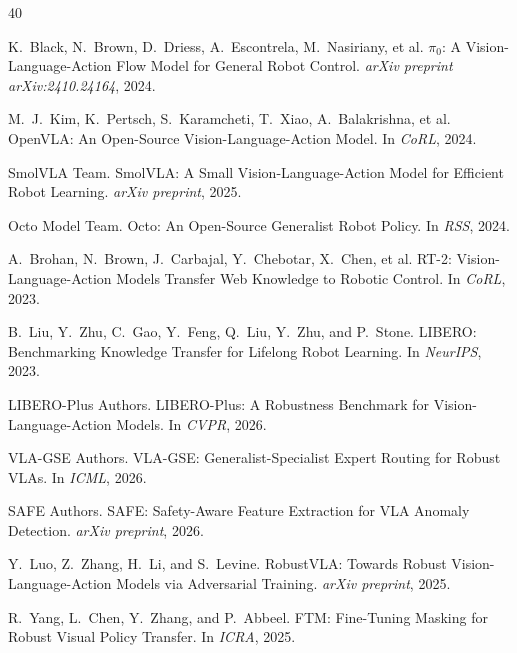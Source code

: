 \documentclass[10pt,twocolumn]{article}
\begin{document}
{\small

\begin{thebibliography}{40}

K.~Black, N.~Brown, D.~Driess, A.~Escontrela, M.~Nasiriany, et al.
\newblock $\pi_0$: A Vision-Language-Action Flow Model for General Robot Control.
\newblock \emph{arXiv preprint arXiv:2410.24164}, 2024.

M.~J.~Kim, K.~Pertsch, S.~Karamcheti, T.~Xiao, A.~Balakrishna, et al.
\newblock OpenVLA: An Open-Source Vision-Language-Action Model.
\newblock In \emph{CoRL}, 2024.

SmolVLA Team.
\newblock SmolVLA: A Small Vision-Language-Action Model for Efficient Robot Learning.
\newblock \emph{arXiv preprint}, 2025.

Octo Model Team.
\newblock Octo: An Open-Source Generalist Robot Policy.
\newblock In \emph{RSS}, 2024.

A.~Brohan, N.~Brown, J.~Carbajal, Y.~Chebotar, X.~Chen, et al.
\newblock RT-2: Vision-Language-Action Models Transfer Web Knowledge to Robotic Control.
\newblock In \emph{CoRL}, 2023.

B.~Liu, Y.~Zhu, C.~Gao, Y.~Feng, Q.~Liu, Y.~Zhu, and P.~Stone.
\newblock LIBERO: Benchmarking Knowledge Transfer for Lifelong Robot Learning.
\newblock In \emph{NeurIPS}, 2023.

LIBERO-Plus Authors.
\newblock LIBERO-Plus: A Robustness Benchmark for Vision-Language-Action Models.
\newblock In \emph{CVPR}, 2026.

VLA-GSE Authors.
\newblock VLA-GSE: Generalist-Specialist Expert Routing for Robust VLAs.
\newblock In \emph{ICML}, 2026.

SAFE Authors.
\newblock SAFE: Safety-Aware Feature Extraction for VLA Anomaly Detection.
\newblock \emph{arXiv preprint}, 2026.

Y.~Luo, Z.~Zhang, H.~Li, and S.~Levine.
\newblock RobustVLA: Towards Robust Vision-Language-Action Models via Adversarial Training.
\newblock \emph{arXiv preprint}, 2025.

R.~Yang, L.~Chen, Y.~Zhang, and P.~Abbeel.
\newblock FTM: Fine-Tuning Masking for Robust Visual Policy Transfer.
\newblock In \emph{ICRA}, 2025.


\end{thebibliography}}
\end{document}
